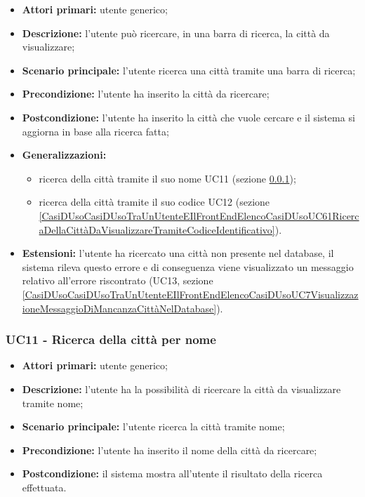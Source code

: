 \begin{itemize}
	\item \textbf{Attori primari:} utente generico;
	\item \textbf{Descrizione:} l’utente può ricercare, in una barra di ricerca, la città da visualizzare;
	\item \textbf{Scenario principale:} l’utente ricerca una città tramite una barra di ricerca;
	\item \textbf{Precondizione:} l’utente ha inserito la città da ricercare;
	\item \textbf{Postcondizione:} l’utente ha inserito la città che vuole cercare e il sistema si aggiorna in base alla ricerca fatta;
	\item \textbf{Generalizzazioni:}
	\begin{itemize}
		\item ricerca della città tramite il suo nome UC11 (sezione \ref{CasiDUsoCasiDUsoTraUnUtenteEIlFrontEndElencoCasiDUsoUC52RicercaDellaCittàDaVisualizzareTramiteNome});
		\item ricerca della città tramite il suo codice UC12 (sezione \ref{CasiDUsoCasiDUsoTraUnUtenteEIlFrontEndElencoCasiDUsoUC61RicercaDellaCittàDaVisualizzareTramiteCodiceIdentificativo}).
	\end{itemize}
	\item \textbf{Estensioni:} l’utente ha ricercato una città non presente nel database, il sistema rileva questo errore e di conseguenza viene visualizzato un messaggio relativo all’errore riscontrato (UC13, sezione \ref{CasiDUsoCasiDUsoTraUnUtenteEIlFrontEndElencoCasiDUsoUC7VisualizzazioneMessaggioDiMancanzaCittàNelDatabase}).
\end{itemize}


\subsubsection{UC11 - Ricerca della città per nome}\label{CasiDUsoCasiDUsoTraUnUtenteEIlFrontEndElencoCasiDUsoUC52RicercaDellaCittàDaVisualizzareTramiteNome}

\begin{itemize}
	\item \textbf{Attori primari:} utente generico;
	\item \textbf{Descrizione:} l’utente ha la possibilità di ricercare la città da visualizzare tramite nome;
	\item \textbf{Scenario principale:} l’utente ricerca la città tramite nome;
	\item \textbf{Precondizione:} l’utente ha inserito il nome della città da ricercare;
	\item \textbf{Postcondizione:} il sistema mostra all’utente il risultato della ricerca effettuata.
\end{itemize}

